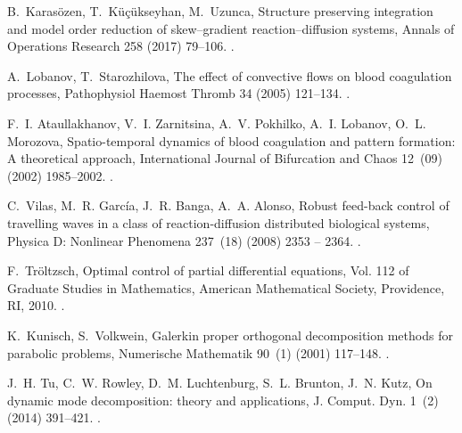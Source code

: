 \documentclass[preprint,12pt]{elsarticle}
\begin{document}
\begin{thebibliography}{10}
B.~Karas\"ozen, T.~K\"u\c{c}\"ukseyhan, M.~Uzunca, Structure preserving
  integration and model order reduction of skew--gradient reaction--diffusion
  systems, Annals of Operations Research 258 (2017) 79--106.
\newblock \href {https://doi.org/10.1007/s10479-015-2063-6}
  {}.

A.~Lobanov, T.~Starozhilova, The effect of convective flows on blood
  coagulation processes, {Pathophysiol Haemost Thromb} 34 (2005) 121--134.
\newblock \href {https://doi.org/10.1159/000089932}
  {}.

F.~I. Ataullakhanov, V.~I. Zarnitsina, A.~V. Pokhilko, A.~I. Lobanov, O.~L.
  Morozova, Spatio-temporal dynamics of blood coagulation and pattern
  formation: A theoretical approach, International Journal of Bifurcation and
  Chaos 12~(09) (2002) 1985--2002.
\newblock \href {https://doi.org/10.1142/S0218127402005649}
  {}.

C.~Vilas, M.~R. García, J.~R. Banga, A.~A. Alonso, Robust feed-back control of
  travelling waves in a class of reaction-diffusion distributed biological
  systems, Physica D: Nonlinear Phenomena 237~(18) (2008) 2353 -- 2364.
\newblock \href {https://doi.org/10.1016/j.physd.2008.02.019}
  {}.

F.~Tr\"oltzsch, Optimal control of partial differential equations, Vol. 112 of
  Graduate Studies in Mathematics, American Mathematical Society, Providence,
  RI, 2010.
\newblock \href {https://doi.org/10.1090/gsm/112} {}.

K.~Kunisch, S.~Volkwein, Galerkin proper orthogonal decomposition methods for
  parabolic problems, Numerische Mathematik 90~(1) (2001) 117--148.
\newblock \href {https://doi.org/10.1007/s002110100282}
  {}.

J.~H. Tu, C.~W. Rowley, D.~M. Luchtenburg, S.~L. Brunton, J.~N. Kutz, On
  dynamic mode decomposition: {t}heory and applications, J. Comput. Dyn. 1~(2)
  (2014) 391--421.
\newblock \href {https://doi.org/10.3934/jcd.2014.1.391}
  {}.

\end{thebibliography}
\end{document}
